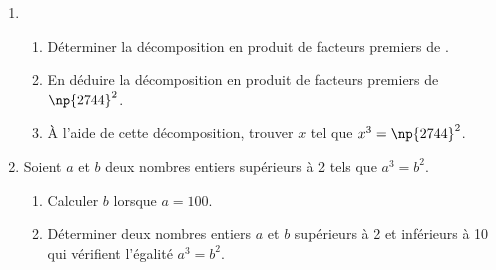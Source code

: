 
\medskip

\begin{enumerate}
\item 
	\begin{enumerate}
		\item Déterminer la décomposition en produit de facteurs premiers de .
		\item En déduire la décomposition en produit de facteurs premiers de $\np{2744}^2$.
	
		\item À l'aide de cette décomposition, trouver $x$ tel que $x^3 = \np{2744}^2$.
	\end{enumerate}
\item Soient $a$ et $b$ deux nombres entiers supérieurs à 2 tels que $a^3 = b^2$.
	\begin{enumerate}
		\item Calculer $b$ lorsque $a = 100$.
		\item Déterminer deux nombres entiers $a$ et $b$ supérieurs à 2 et inférieurs à 10 qui vérifient l'égalité $a^3 = b^2$.

	\end{enumerate}
\end{enumerate}

\bigskip

